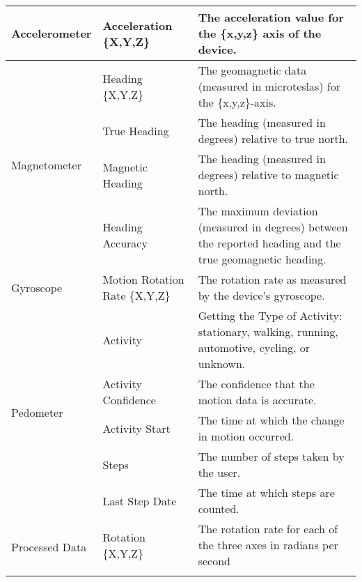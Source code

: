 \begin{table*}[h]
\begin{tabular}{|l|p{3.5cm}|p{10.5cm}|}
Accelerometer                   & Acceleration \{X,Y,Z\}         & The acceleration value for the \{x,y,z\} axis of the device.                                               \\ \hline
\multirow{4}{*}{Magnetometer}   & Heading \{X,Y,Z\}              & The geomagnetic data (measured in microteslas) for the \{x,y,z\}-axis.                                     \\ \cline{2-3} 
                                & True Heading                   & The heading (measured in degrees) relative to true north.                                                  \\ \cline{2-3} 
                                & Magnetic Heading               & The heading (measured in degrees) relative to magnetic north.                                              \\ \cline{2-3} 
                                & Heading Accuracy               & The maximum deviation (measured in degrees) between the reported heading and \newline the true geomagnetic heading. \\ \hline
Gyroscope                       & Motion Rotation Rate \{X,Y,Z\} & The rotation rate as measured by the device’s gyroscope.                                                   \\ \hline
\multirow{5}{*}{Pedometer}      & Activity                       & Getting the Type of Activity: stationary, walking, running, automotive, cycling, or unknown.               \\ \cline{2-3} 
                                & Activity Confidence            & The confidence that the motion data is accurate.                                                           \\ \cline{2-3} 
                                & Activity Start                 & The time at which the change in motion occurred.                                                           \\ \cline{2-3} 
                                & Steps                          & The number of steps taken by the user.                                                                     \\ \cline{2-3} 
                                & Last Step Date                 & The time at which steps are counted.                                                                       \\ \hline
\multirow{6}{*}{Processed Data} & Rotation \{X,Y,Z\}             & The rotation rate for each of the three axes in radians per second                                         \\ \cline{2-3} 

\end{tabular}
\end{table*}
